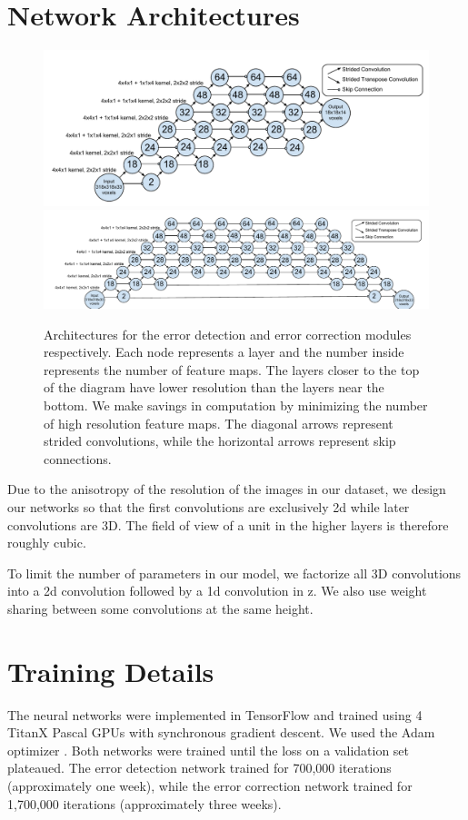 \documentclass{article}
\begin{document}

\begin{appendices}
\section{Network Architectures}
\label{appendix:architecture}

\begin{figure}
\centering
\includegraphics[width=1.0\linewidth]{error_detector.pdf}
\centering
\includegraphics[width=1.0\linewidth]{error_corrector.pdf}

\caption{Architectures for the error detection and error correction modules respectively. Each node represents a layer and the number inside represents the number of feature maps. The layers closer to the top of the diagram have lower resolution than the layers near the bottom. We make savings in computation by minimizing the number of high resolution feature maps. The diagonal arrows represent strided convolutions, while the horizontal arrows represent skip connections.}
\label{fig:architecture}
\end{figure}

Due to the anisotropy of the resolution of the images in our dataset, we design our networks so that the first convolutions are exclusively 2d while later convolutions are 3D. The field of view of a unit in the higher layers is therefore roughly cubic.


To limit the number of parameters in our model, we factorize all 3D convolutions into a 2d convolution followed by a 1d convolution in z. We also use weight sharing between some convolutions at the same height.

\section{Training Details}
The neural networks were implemented in TensorFlow \cite{tensorflow} and trained using 4 TitanX Pascal GPUs with synchronous gradient descent. We used the Adam optimizer \cite{adam}.   Both networks were trained until the loss on a validation set plateaued. The error detection network trained for 700,000 iterations (approximately one week), while the error correction network trained for 1,700,000 iterations (approximately three weeks).
\end{appendices}
\end{document}
